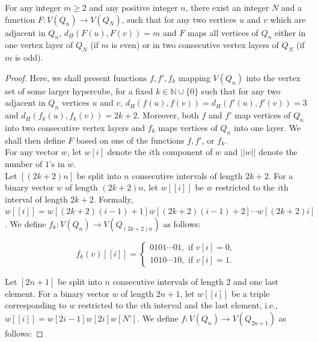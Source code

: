 \documentclass[10pt,a4paper]{amsart}
\begin{document}
\begin{theorem}
For any integer $m\geq 2$ and any positive integer $n$, there exist an integer $N$ and  a function $F: V(Q_n) \rightarrow V(Q_N)$, such that 
for any two vertices $u$ and $v$ which are adjacent in $Q_n$,  $d_H(F(u), F(v))=m$ and $F$ maps all vertices of $Q_n$ either in one vertex layer of $Q_N$ (if $m$ is even) or 
in two consecutive vertex layers of $Q_N$ (if $m$ is odd).
\end{theorem}

\begin{proof}

Here, we shall present functions $f, f', f_k$ mapping $V(Q_n)$ into the vertex set of some larger hypercube, for a fixed $k\in\mathbb{N}\cup \{0\}$  such that 
for any two adjacent in $Q_n$ vertices $u$ and $v$,  $d_H(f(u), f(v))= d_H(f'(u), f'(v))=3$ and $d_H(f_k(u), f_k(v))=2k+2$. 
Moreover, both $f$ and $f'$ map vertices of $Q_n$ into two consecutive vertex layers  and $f_k$ maps vertices of $Q_n$ into one layer. We shall then define $F$ based on one of the functions $f, f'$, or $f_k$.\\

For any vector $w$, let  $w[i]$ denote the $i$th component of $w$ and $||w||$ denote the number of $1$'s in $w$. \\


Let $[(2k+2)n]$ be split into $n$ consecutive intervals of length $2k+2$.   For a binary vector $w$ of length $(2k+2)n$, let $w[[i]]$ be $w$ restricted to the $i$th interval of length $2k+2$. Formally, $w[[i]] = w[(2k+2)(i-1)+1] w[(2k+2)(i-1)+2] \cdots w[(2k+2)i]$. We define $f_k: V(Q_n) \rightarrow V(Q_{(2k+2)n})$ as follows:

\begin{equation} \nonumber
f_k(v)[[i]] = \begin{cases}
0101\cdots 01,  \mbox{ if }  v[i]=0, \\
1010\cdots 10,  \mbox{ if }  v[i]=1.
\end{cases}
\end{equation}



\vskip 1cm


Let $[2n+1]$ be split into $n$ consecutive intervals of length $2$ and one last element. For a binary vector $w$ of length $2n+1$, let $w[[i]]$ be a triple corresponding to $w$ restricted to the $i$th interval and the last element, i.e., $w[[i]]= w[2i-1] w[2i] w[N']$.   We define $f: V(Q_n)\rightarrow V(Q_{2n+1})$ as follows:


\end{proof}
\end{document}
